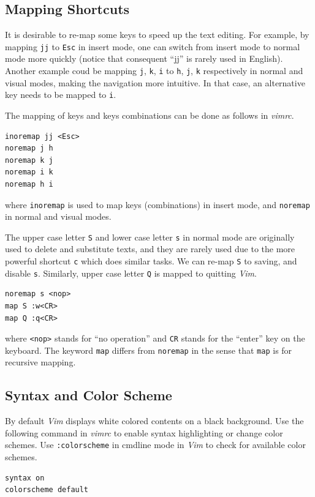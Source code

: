 \subsection{Mapping Shortcuts}

It is desirable to re-map some keys to speed up the text editing. For example, by mapping \verb|jj| to \verb|Esc| in insert mode, one can switch from insert mode to normal mode more quickly (notice that consequent ``jj'' is rarely used in English). Another example coud be mapping \verb|j|, \verb|k|, \verb|i| to \verb|h|, \verb|j|, \verb|k| respectively in normal and visual modes, making the navigation more intuitive. In that case, an alternative key needs to be mapped to \verb|i|.

The mapping of keys and keys combinations can be done as follows in \textit{vimrc}.
\begin{lstlisting}
inoremap jj <Esc>
noremap j h
noremap k j
noremap i k
noremap h i
\end{lstlisting}
where \verb|inoremap| is used to map keys (combinations) in insert mode, and \verb|noremap| in normal and visual modes.

The upper case letter \verb|S| and lower case letter \verb|s| in normal mode are originally used to delete and substitute texts, and they are rarely used due to the more powerful shortcut \verb|c| which does similar tasks. We can re-map \verb|S| to saving, and disable \verb|s|. Similarly, upper case letter \verb|Q| is mapped to quitting \textit{Vim}.
\begin{lstlisting}
noremap s <nop>
map S :w<CR>
map Q :q<CR>
\end{lstlisting}
where \verb|<nop>| stands for ``no operation'' and \verb|CR| stands for the ``enter'' key on the keyboard. The keyword \verb|map| differs from \verb|noremap| in the sense that \verb|map| is for recursive mapping.

\subsection{Syntax and Color Scheme}

By default \textit{Vim} displays white colored contents on a black background. Use the following command in \textit{vimrc} to enable syntax highlighting or change color schemes. Use \verb|:colorscheme| in cmdline mode in \textit{Vim} to check for available color schemes.
\begin{lstlisting}
syntax on
colorscheme default
\end{lstlisting}


